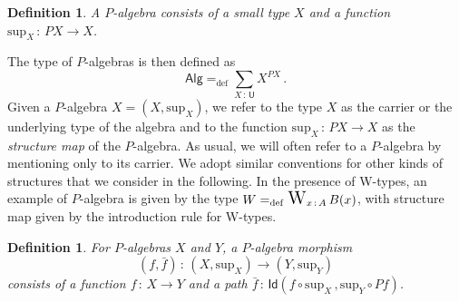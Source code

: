 \documentclass[10pt,a4paper,oneside,reqno]{amsart}
\theoremstyle{mythm}
\theoremstyle{mydef}
\newtheorem{definition}[theorem]{Definition}
\theoremstyle{myrmk}
\newcommand{\defeq}{=_{\mathrm{def}}}
\newcommand{\co}{\,{:}\,}
\newcommand{\Id}{\mathsf{Id}}
\DeclareMathOperator*{\WW}{\text{\Large $\mathrm{W}$}}
\newcommand{\U}{\mathsf{U}}
\newcommand{\Palg}{\mathsf{Alg}}
\renewcommand{\sup}{\mathrm{sup}}
\begin{document}
\begin{definition} A \emph{$P$-algebra} consists of a small type $X$ and a function $\sup_X \co PX \to X$. 
\end{definition}

\smallskip

 The type of $P$-algebras is then defined as 
 \[
 \Palg  \defeq \sum_{X \co \U} X^{PX} \, .
 \]
 Given a $P$-algebra $X = (X, \sup_X)$,
 we refer to the type $X$ as the carrier or the underlying type of the algebra and to the function $\sup_X \co PX\to X$ as the \emph{structure map} of the $P$-algebra. 
 As usual,  we will often refer to a 
 $P$-algebra by mentioning only to its carrier. We adopt similar conventions for other kinds of structures that we consider
 in the following.  In the
 presence of W-types, an example of $P$-algebra is given by the type $W \defeq \WW_{x\co A} B(x)$, with structure map given by the introduction rule for W-types.
 


\begin{definition}
For $P$-algebras $X$ and $Y$, a \emph{$P$-algebra morphism}
\[
(f, \bar{f}) \co (X, \sup_X) \rightarrow (Y, \sup_Y)
\]
consists of a function $f \co X \rightarrow Y$ and a path $\bar{f} \co \Id( f \circ \sup_X \, ,  \sup_{Y} \circ P f )$.
\end{definition}
\end{document}
